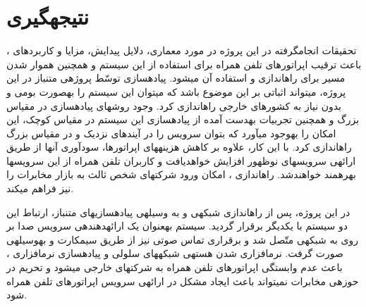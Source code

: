 \chapter{نتیجه\nf  گیری}


تحقیقات انجام\nf گرفته در این پروژه در مورد معماری، دلایل پیدایش، مزایا و کاربردهای ، باعث ترقیب اپراتورهای تلفن همراه برای استفاده از این سیستم و همچنین هموار شدن مسیر برای راه\nf اندازی و استفاده آن می\nf شود. پیاده\nf سازی  توسّط پروژه\nf ی متن\nf باز  در این پروژه، می\nf تواند اثباتی بر این موضوع باشد که می\nf توان این سیستم را به\nf صورت بومی و بدون نیاز به کشورهای خارجی راه\nf اندازی کرد. وجود روش\nf های پیاده\nf سازی در مقیاس بزرگ و همچنین تجربیات به\nf دست آمده از پیاده\nf سازی این سیستم در مقیاس کوچک، این امکان را به\nf وجود می\nf آورد که بتوان سرویس  را در آینده\nf ای نزدیک و در مقیاس بزرگ راه\nf اندازی کرد. با این کار، علاوه بر کاهش هزینه\nf های اپراتورها، سودآوری آن\nf ها از طریق ارائه\nf ی سرویس\nf های نوظهور افزایش خواهدیافت و کاربران تلفن همراه از این سرویس\nf ها بهره\nf مند خواهندشد. راه\nf اندازی ، امکان ورود شرکت\nf های شخص ثالث به بازار مخابرات را نیز فراهم می\nf کند.

در این پروژه، پس از راه\nf اندازی شبکه\nf ی  و  به وسیله\nf ی پیاده\nf سازی\nf های متن\nf باز، ارتباط این دو سیستم با یکدیگر برقرار گردید. سیستم  به\nf عنوان یک ارائه\nf دهنده\nf ی سرویس صدا بر روی  به شبکه\nf ی  متّصل شد و برقراری تماس صوتی نیز از طریق سیم\nf کارت و به\nf وسیله\nf ی  صورت گرفت. نرم\nf افزاری شدن هسته\nf ی شبکه\nf های سلولی و پیاده\nf سازی نرم\nf افزاری ، باعث عدم وابستگی اپراتورهای تلفن همراه به شرکت\nf های خارجی می\nf شود و تحریم در حوزه\nf ی مخابرات نمی\nf تواند باعث ایجاد مشکل در ارائه\nf ی سرویس اپراتورهای تلفن همراه شود.

